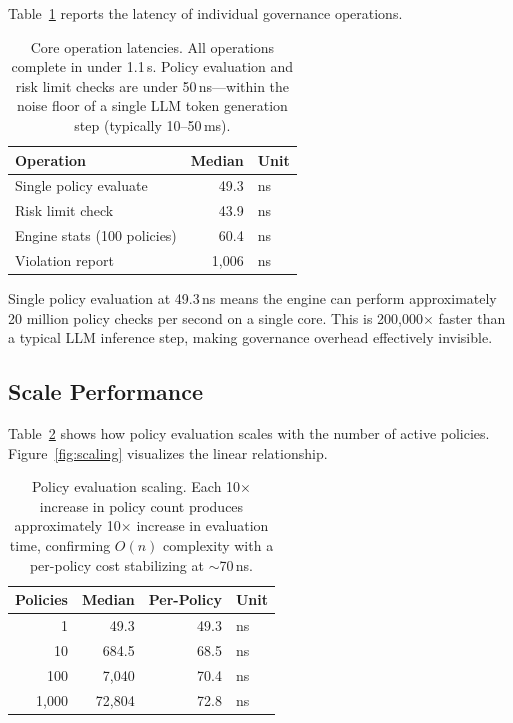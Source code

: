 \documentclass[10pt, twocolumn]{article}
\begin{document}
Table~\ref{tab:latency} reports the latency of individual governance operations.

\begin{table}[t]
\caption{Core operation latencies. All operations complete in under 1.1\,\textmu{}s. Policy evaluation and risk limit checks are under 50\,ns---within the noise floor of a single LLM token generation step (typically 10--50\,ms).}
\label{tab:latency}
\centering
\small
\begin{tabular}{@{}lrl@{}}
\toprule
\textbf{Operation} & \textbf{Median} & \textbf{Unit} \\
\midrule
Single policy evaluate & 49.3 & ns \\
Risk limit check & 43.9 & ns \\
Engine stats (100 policies) & 60.4 & ns \\
Violation report & 1{,}006 & ns \\
\bottomrule
\end{tabular}
\end{table}

Single policy evaluation at 49.3\,ns means the engine can perform approximately 20 million policy checks per second on a single core. This is 200{,}000$\times$ faster than a typical LLM inference step, making governance overhead effectively invisible.

\subsection{Scale Performance}

Table~\ref{tab:scaling} shows how policy evaluation scales with the number of active policies. Figure~\ref{fig:scaling} visualizes the linear relationship.

\begin{table}[t]
\caption{Policy evaluation scaling. Each 10$\times$ increase in policy count produces approximately 10$\times$ increase in evaluation time, confirming $O(n)$ complexity with a per-policy cost stabilizing at $\sim$70\,ns.}
\label{tab:scaling}
\centering
\small
\begin{tabular}{@{}rrrl@{}}
\toprule
\textbf{Policies} & \textbf{Median} & \textbf{Per-Policy} & \textbf{Unit} \\
\midrule
1 & 49.3 & 49.3 & ns \\
10 & 684.5 & 68.5 & ns \\
100 & 7{,}040 & 70.4 & ns \\
1{,}000 & 72{,}804 & 72.8 & ns \\
\bottomrule
\end{tabular}
\end{table}
\end{document}

